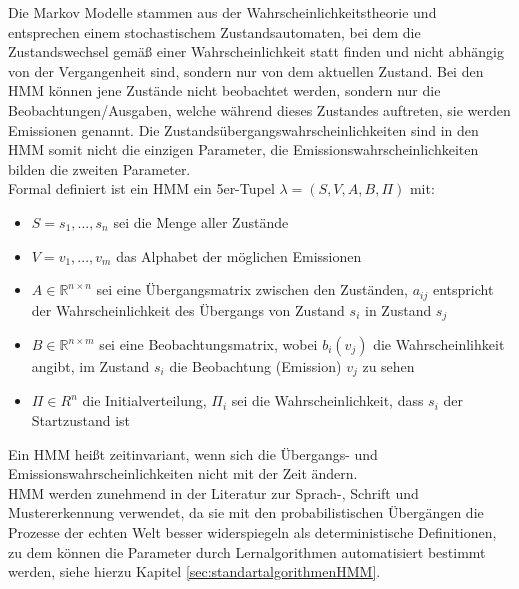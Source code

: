 Die Markov Modelle stammen aus der Wahrscheinlichkeitstheorie und entsprechen einem stochastischem Zustandsautomaten, bei dem die Zustandswechsel gemäß einer Wahrscheinlichkeit statt finden und nicht abhängig von der Vergangenheit sind, sondern nur von dem aktuellen Zustand\cite{Stamp04arevealing}.
Bei den HMM können jene Zustände nicht beobachtet werden, sondern nur die Beobachtungen/Ausgaben, welche während dieses Zustandes auftreten, sie werden Emissionen genannt.
Die Zustandsübergangswahrscheinlichkeiten sind in den HMM somit nicht die einzigen Parameter, die Emissionswahrscheinlichkeiten bilden die zweiten Parameter.\\
Formal definiert ist ein HMM ein 5er-Tupel $\lambda= (S, V, A, B, \Pi)$ mit:
\begin{itemize}
 \item $S = {s_1,..., s_n}$ sei die Menge aller Zustände
 \item $V = {v_1,..., v_m}$ das Alphabet der möglichen Emissionen
 \item $A \in \mathbb{R}^{n \times n}$ sei eine Übergangsmatrix zwischen den Zuständen, $a_{ij}$ entspricht der Wahrscheinlichkeit des Übergangs von Zustand $s_i$ in Zustand $s_j$
 \item $B \in \mathbb{R}^{n\times m}$ sei eine Beobachtungsmatrix, wobei $b_i(v_j)$ die Wahrscheinlihkeit angibt, im Zustand $s_i$ die Beobachtung (Emission) $v_j$ zu sehen
 \item $\Pi \in R^n$ die Initialverteilung, $\Pi_i$ sei die Wahrscheinlichkeit, dass $s_i$ der Startzustand ist
\end{itemize}
Ein HMM heißt zeitinvariant, wenn sich die Übergangs- und Emissionswahrscheinlichkeiten nicht mit der Zeit ändern.\\
HMM werden zunehmend in der Literatur zur Sprach-, Schrift und Mustererkennung \cite{Gales:2007:AHM:1373536.1373537}\cite{Yang1995161} verwendet, da sie mit den probabilistischen Übergängen die Prozesse der echten Welt besser widerspiegeln als deterministische Definitionen, zu dem können die Parameter durch Lernalgorithmen automatisiert bestimmt werden,
 siehe hierzu Kapitel \ref{sec:standartalgorithmenHMM}.

